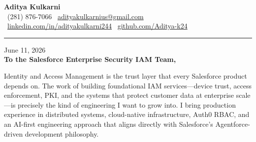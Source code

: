 \documentclass[11pt,letterpaper]{article}
\begin{document}
\begin{center}
    {\Huge \textbf{\color{SalesforceBlue} Aditya Kulkarni}}\\[8pt]
    {\color{DarkGrey} \small
    \faPhone \ (281) 876-7066 \quad \textbar \quad
    \faEnvelope \ \href{mailto:adityakulkarnius@gmail.com}{adityakulkarnius@gmail.com} \\[4pt]
    \faLinkedin \ \href{https://linkedin.com/in/adityakulkarni244}{linkedin.com/in/adityakulkarni244} \quad \textbar \quad
    \faGithub \ \href{https://github.com/Aditya-k24}{github.com/Aditya-k24}
    }
\end{center}

\vspace{-4pt}
{\color{SalesforceBlue}\rule{\linewidth}{1.5pt}}
\vspace{10pt}

June 11, 2026\\[10pt]
\textbf{To the Salesforce Enterprise Security IAM Team,}

\vspace{6pt}

Identity and Access Management is the trust layer that every Salesforce product depends on. The work of building foundational IAM services---device trust, access enforcement, PKI, and the systems that protect customer data at enterprise scale---is precisely the kind of engineering I want to grow into. I bring production experience in distributed systems, cloud-native infrastructure, Auth0 RBAC, and an AI-first engineering approach that aligns directly with Salesforce's Agentforce-driven development philosophy.

\vspace{4pt}
\end{document}

